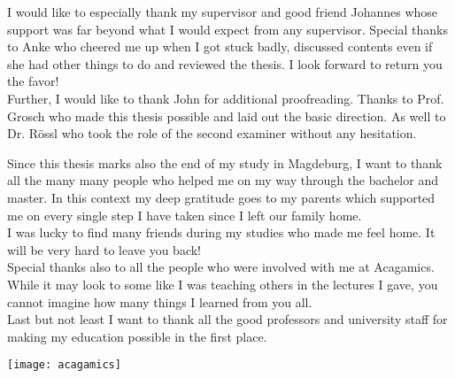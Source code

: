 \documentclass[thesis.tex]{subfiles}
\begin{document}
\label{chap:Acknowledgments}

I would like to especially thank my supervisor and good friend Johannes whose support was far beyond what I would expect from any supervisor.
Special thanks to Anke who cheered me up when I got stuck badly, discussed contents even if she had other things to do and reviewed the thesis.
I look forward to return you the favor!
\\
Further, I would like to thank John  for additional proofreading.
Thanks to Prof. Grosch who made this thesis possible and laid out the basic direction.
As well to Dr. Rössl who took the role of the second examiner without any hesitation.

Since this thesis marks also the end of my study in Magdeburg, I want to thank all the many many people who helped me on my way through the bachelor and master.
In this context my deep gratitude goes to my parents which supported me on every single step I have taken since I left our family home.
\\
I was lucky to find many friends during my studies who made me feel home.
It will be very hard to leave you back!
\\
Special thanks also to all the people who were involved with me at Acagamics.
While it may look to some like I was teaching others in the lectures I gave, you cannot imagine how many things I learned from you all.
\\
Last but not least I want to thank all the good professors and university staff for making my education possible in the first place.

\begin{figure*}
\centering
\texttt{[image: acagamics]}
\end{figure*}

\newpage
\end{document}
